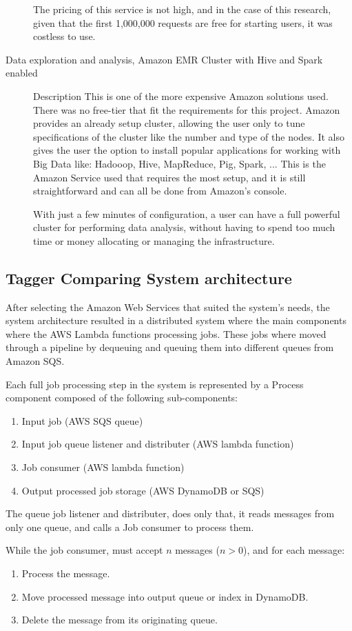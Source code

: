 \begin{description}
The pricing of this service is not high, and in the case of this research, given that the first 1,000,000 requests are free for starting users,
it was costless to use.

\item[Data exploration and analysis, Amazon EMR Cluster with Hive and Spark enabled] Description
This is one of the more expensive Amazon solutions used. There was no free-tier that fit the requirements for this project.
Amazon provides an already setup cluster, allowing the user only to tune specifications of the cluster like the number and type of the nodes.
It also gives the user the option to install popular applications for working with Big Data like: Hadooop, Hive, MapReduce, Pig, Spark, ...
This is the Amazon Service used that requires the most setup, and it is still straightforward and can all be done from Amazon's console. 

With just a few minutes of configuration, a user can have a full powerful cluster for performing data analysis, without having to spend too much 
time or money allocating or managing the infrastructure.
\end{description}


\subsection{Tagger Comparing System architecture}
After selecting the Amazon Web Services that suited the system's needs, the system architecture resulted in a distributed system where the main components where the AWS Lambda functions processing jobs.
These jobs where moved through a pipeline by dequeuing and queuing them into different queues from Amazon SQS.

Each full job processing step in the system is represented by a Process component composed of the following sub-components:
\begin{enumerate}
\item Input job (AWS SQS queue)
\item Input job queue listener and distributer (AWS lambda function)
\item Job consumer (AWS lambda function)
\item Output processed job storage (AWS DynamoDB or SQS)
\end{enumerate}
The queue job listener and distributer, does only that, it reads messages from only one queue, and calls a Job consumer to process them.

While the job consumer, must accept $n$ messages ($n > 0$), and for each message:
\begin{enumerate}
\item Process the message.
\item Move processed message into output queue or index in DynamoDB.
\item Delete the message from its originating queue.
\end{enumerate}

